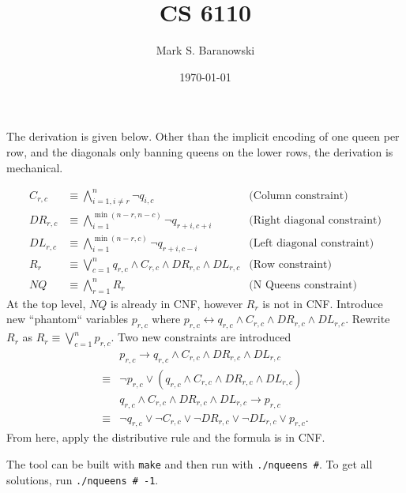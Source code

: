 \documentclass[paper=a4, fontsize=11pt]{scrartcl} %
\title{	
\normalfont \normalsize 
\textsc{CS 6110} \\ %
}
\author{Mark S. Baranowski} %
\date{\normalsize\today} %
\numberwithin{equation}{section} %
\numberwithin{figure}{section} %
\numberwithin{table}{section} %
\begin{document}
\maketitle %

The derivation is given below. Other than the implicit encoding of one queen per row, and the diagonals only banning queens on the lower rows, the derivation is mechanical.

\begin{align*}
C_{r,c} & \equiv \bigwedge_{i=1, i \ne r}^n \neg q_{i,c} & \text{(Column constraint)}\\
DR_{r,c} & \equiv \bigwedge_{i=1}^{\min(n-r, n-c)}\neg q_{r+i, c+i} & \text{(Right diagonal constraint)}\\
DL_{r,c} & \equiv \bigwedge_{i=1}^{\min(n-r, c)}\neg q_{r+i, c-i} & \text{(Left diagonal constraint)}\\
R_{r} &\equiv \bigvee_{c=1}^n q_{r,c} \wedge C_{r,c}\wedge DR_{r,c} \wedge DL_{r,c} &\text{(Row constraint)}\\
NQ &\equiv \bigwedge_{r=1}^nR_r & \text{(N Queens constraint)}
\end{align*}
At the top level, $NQ$ is already in CNF, however $R_r$ is not in CNF. Introduce new ``phantom`` variables $p_{r,c}$ where
$p_{r,c}\leftrightarrow q_{r,c} \wedge C_{r,c}\wedge DR_{r,c} \wedge DL_{r,c}.$
Rewrite $R_r$ as $R_r \equiv \bigvee_{c=1}^n p_{r,c}.$
Two new constraints are introduced
\begin{align*}
&p_{r,c} \rightarrow q_{r,c} \wedge C_{r,c} \wedge DR_{r,c} \wedge DL_{r,c}\\
\equiv&\neg p_{r,c} \vee (q_{r,c} \wedge C_{r,c} \wedge DR_{r,c} \wedge DL_{r,c})\\
&q_{r,c} \wedge C_{r,c} \wedge DR_{r,c} \wedge DL_{r,c}\rightarrow p_{r,c}\\
\equiv&\neg q_{r,c} \vee \neg C_{r,c} \vee \neg DR_{r,c} \vee \neg DL_{r,c} \vee p_{r,c}.
\end{align*}
From here, apply the distributive rule and the formula is in CNF.

The tool can be built with {\tt make} and then run with {\tt ./nqueens \#}. To get all solutions, run {\tt ./nqueens \# -1}.
\end{document}
